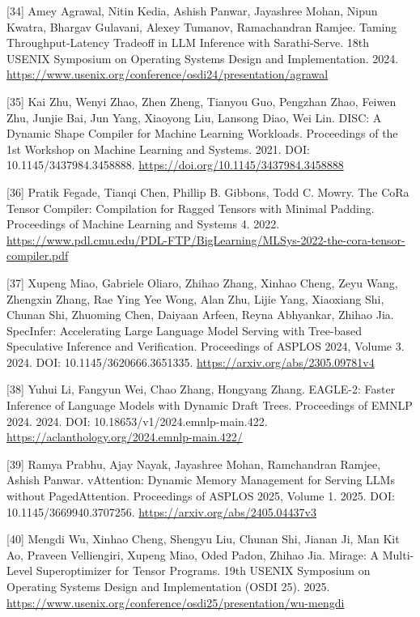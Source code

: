 \documentclass[UTF8,11pt,fontset=windows]{ctexart}
\begin{document}
\leavevmode{}%
{[}34{]} Amey Agrawal, Nitin Kedia, Ashish Panwar, Jayashree Mohan, Nipun Kwatra, Bhargav Gulavani, Alexey Tumanov, Ramachandran Ramjee. Taming Throughput-Latency Tradeoff in LLM Inference with Sarathi-Serve. 18th USENIX Symposium on Operating Systems Design and Implementation. 2024. \url{https://www.usenix.org/conference/osdi24/presentation/agrawal}

\leavevmode{}%
{[}35{]} Kai Zhu, Wenyi Zhao, Zhen Zheng, Tianyou Guo, Pengzhan Zhao, Feiwen Zhu, Junjie Bai, Jun Yang, Xiaoyong Liu, Lansong Diao, Wei Lin. DISC: A Dynamic Shape Compiler for Machine Learning Workloads. Proceedings of the 1st Workshop on Machine Learning and Systems. 2021. DOI: 10.1145/3437984.3458888. \url{https://doi.org/10.1145/3437984.3458888}

\leavevmode{}%
{[}36{]} Pratik Fegade, Tianqi Chen, Phillip B. Gibbons, Todd C. Mowry. The CoRa Tensor Compiler: Compilation for Ragged Tensors with Minimal Padding. Proceedings of Machine Learning and Systems 4. 2022. \url{https://www.pdl.cmu.edu/PDL-FTP/BigLearning/MLSys-2022-the-cora-tensor-compiler.pdf}

\leavevmode{}%
{[}37{]} Xupeng Miao, Gabriele Oliaro, Zhihao Zhang, Xinhao Cheng, Zeyu Wang, Zhengxin Zhang, Rae Ying Yee Wong, Alan Zhu, Lijie Yang, Xiaoxiang Shi, Chunan Shi, Zhuoming Chen, Daiyaan Arfeen, Reyna Abhyankar, Zhihao Jia. SpecInfer: Accelerating Large Language Model Serving with Tree-based Speculative Inference and Verification. Proceedings of ASPLOS 2024, Volume 3. 2024. DOI: 10.1145/3620666.3651335. \url{https://arxiv.org/abs/2305.09781v4}

\leavevmode{}%
{[}38{]} Yuhui Li, Fangyun Wei, Chao Zhang, Hongyang Zhang. EAGLE-2: Faster Inference of Language Models with Dynamic Draft Trees. Proceedings of EMNLP 2024. 2024. DOI: 10.18653/v1/2024.emnlp-main.422. \url{https://aclanthology.org/2024.emnlp-main.422/}

\leavevmode{}%
{[}39{]} Ramya Prabhu, Ajay Nayak, Jayashree Mohan, Ramchandran Ramjee, Ashish Panwar. vAttention: Dynamic Memory Management for Serving LLMs without PagedAttention. Proceedings of ASPLOS 2025, Volume 1. 2025. DOI: 10.1145/3669940.3707256. \url{https://arxiv.org/abs/2405.04437v3}

\leavevmode{}%
{[}40{]} Mengdi Wu, Xinhao Cheng, Shengyu Liu, Chunan Shi, Jianan Ji, Man Kit Ao, Praveen Velliengiri, Xupeng Miao, Oded Padon, Zhihao Jia. Mirage: A Multi-Level Superoptimizer for Tensor Programs. 19th USENIX Symposium on Operating Systems Design and Implementation (OSDI 25). 2025. \url{https://www.usenix.org/conference/osdi25/presentation/wu-mengdi}
\end{document}
